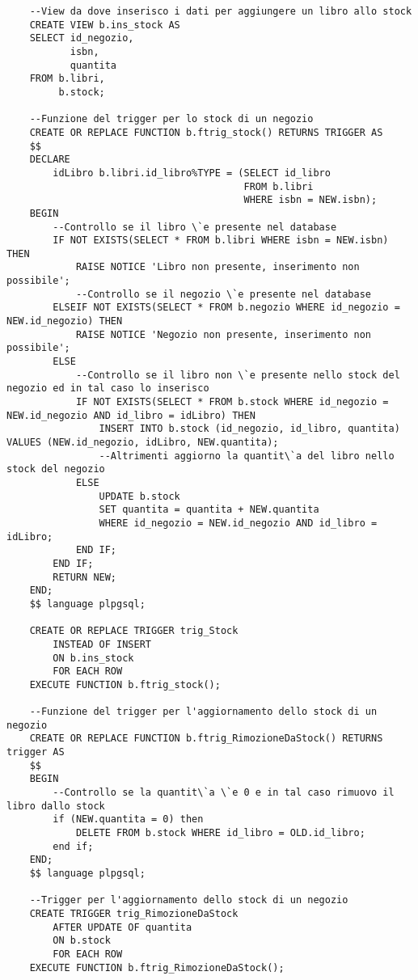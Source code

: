 \begin{lstlisting}
    --View da dove inserisco i dati per aggiungere un libro allo stock
    CREATE VIEW b.ins_stock AS
    SELECT id_negozio,
           isbn,
           quantita
    FROM b.libri,
         b.stock;
    
    --Funzione del trigger per lo stock di un negozio
    CREATE OR REPLACE FUNCTION b.ftrig_stock() RETURNS TRIGGER AS
    $$
    DECLARE
        idLibro b.libri.id_libro%TYPE = (SELECT id_libro
                                         FROM b.libri
                                         WHERE isbn = NEW.isbn);
    BEGIN
        --Controllo se il libro \`e presente nel database
        IF NOT EXISTS(SELECT * FROM b.libri WHERE isbn = NEW.isbn) THEN
            RAISE NOTICE 'Libro non presente, inserimento non possibile';
            --Controllo se il negozio \`e presente nel database
        ELSEIF NOT EXISTS(SELECT * FROM b.negozio WHERE id_negozio = NEW.id_negozio) THEN
            RAISE NOTICE 'Negozio non presente, inserimento non possibile';
        ELSE
            --Controllo se il libro non \`e presente nello stock del negozio ed in tal caso lo inserisco
            IF NOT EXISTS(SELECT * FROM b.stock WHERE id_negozio = NEW.id_negozio AND id_libro = idLibro) THEN
                INSERT INTO b.stock (id_negozio, id_libro, quantita) VALUES (NEW.id_negozio, idLibro, NEW.quantita);
                --Altrimenti aggiorno la quantit\`a del libro nello stock del negozio
            ELSE
                UPDATE b.stock
                SET quantita = quantita + NEW.quantita
                WHERE id_negozio = NEW.id_negozio AND id_libro = idLibro;
            END IF;
        END IF;
        RETURN NEW;
    END;
    $$ language plpgsql;
    
    CREATE OR REPLACE TRIGGER trig_Stock
        INSTEAD OF INSERT
        ON b.ins_stock
        FOR EACH ROW
    EXECUTE FUNCTION b.ftrig_stock();
    
    --Funzione del trigger per l'aggiornamento dello stock di un negozio
    CREATE OR REPLACE FUNCTION b.ftrig_RimozioneDaStock() RETURNS trigger AS
    $$
    BEGIN
        --Controllo se la quantit\`a \`e 0 e in tal caso rimuovo il libro dallo stock
        if (NEW.quantita = 0) then
            DELETE FROM b.stock WHERE id_libro = OLD.id_libro;
        end if;
    END;
    $$ language plpgsql;
    
    --Trigger per l'aggiornamento dello stock di un negozio
    CREATE TRIGGER trig_RimozioneDaStock
        AFTER UPDATE OF quantita
        ON b.stock
        FOR EACH ROW
    EXECUTE FUNCTION b.ftrig_RimozioneDaStock();
\end{lstlisting}

